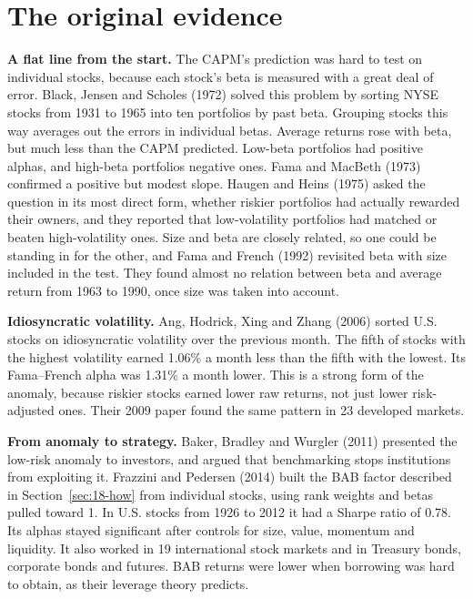 \section{The original evidence}
\label{sec:18-evidence}

\textbf{A flat line from the start.} The CAPM's prediction was hard to test on individual stocks, because each stock's beta is measured with a great deal of error. Black, Jensen and Scholes (1972) solved this problem by sorting NYSE stocks from 1931 to 1965 into ten portfolios by past beta. Grouping stocks this way averages out the errors in individual betas. Average returns rose with beta, but much less than the CAPM predicted. Low-beta portfolios had positive alphas, and high-beta portfolios negative ones. Fama and MacBeth (1973) confirmed a positive but modest slope. Haugen and Heins (1975) asked the question in its most direct form, whether riskier portfolios had actually rewarded their owners, and they reported that low-volatility portfolios had matched or beaten high-volatility ones. Size and beta are closely related, so one could be standing in for the other, and Fama and French (1992) revisited beta with size included in the test. They found almost no relation between beta and average return from 1963 to 1990, once size was taken into account.

\textbf{Idiosyncratic volatility.} Ang, Hodrick, Xing and Zhang (2006) sorted U.S. stocks on idiosyncratic volatility over the previous month. The fifth of stocks with the highest volatility earned 1.06\% a month less than the fifth with the lowest. Its Fama--French alpha was 1.31\% a month lower. This is a strong form of the anomaly, because riskier stocks earned lower raw returns, not just lower risk-adjusted ones. Their 2009 paper found the same pattern in 23 developed markets.

\textbf{From anomaly to strategy.} Baker, Bradley and Wurgler (2011) presented the low-risk anomaly to investors, and argued that benchmarking stops institutions from exploiting it. Frazzini and Pedersen (2014) built the BAB factor described in Section~\ref{sec:18-how} from individual stocks, using rank weights and betas pulled toward 1. In U.S. stocks from 1926 to 2012 it had a Sharpe ratio of 0.78. Its alphas stayed significant after controls for size, value, momentum and liquidity. It also worked in 19 international stock markets and in Treasury bonds, corporate bonds and futures. BAB returns were lower when borrowing was hard to obtain, as their leverage theory predicts.

